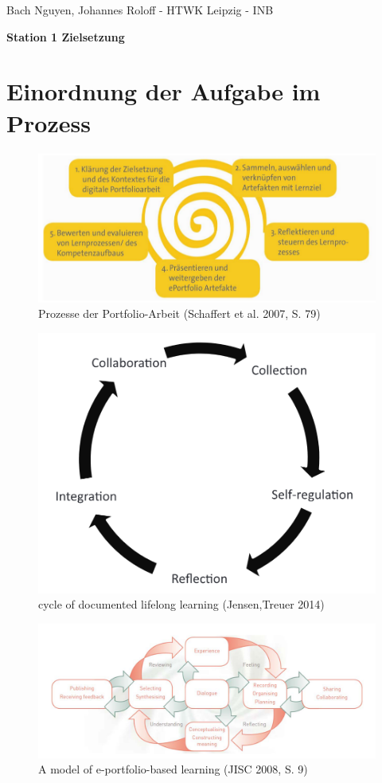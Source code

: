 \documentclass[a4paper,oneside]{scrarticle}
\begin{document}
	\begin{flushleft}
		Bach Nguyen, Johannes Roloff - HTWK Leipzig - INB
	\end{flushleft}

	\begin{center}
		\begin{LARGE}
			\textbf{Station 1 Zielsetzung}
		\end{LARGE}
	\end{center}
	\section*{Einordnung der Aufgabe im Prozess}
	\begin{figure} [h]
		\centering
		\includegraphics[width=0.7\linewidth]{e-portfolio-prozesse-schaffert}
		\caption{Prozesse der Portfolio-Arbeit (Schaffert et al. 2007, S. 79)}
		\label{fig:e-portfolio-prozesse-schaffert}
	\end{figure}
	\begin{figure}[h]
		\centering
		\includegraphics[width=0.5\linewidth]{cycle-of-documented-lifelong-learning-Jensen}
		\caption{cycle of documented lifelong learning (Jensen,Treuer 2014)}
		\label{fig:cycle-of-documented-lifelong-learning-jensen}
	\end{figure}
	\begin{figure}[h]
		\centering
		\includegraphics[width=0.8\linewidth]{model-of-e-portfolio-based-learning}
		\caption{A model of e-portfolio-based learning (JISC 2008, S. 9)}
		\label{fig:model-of-e-portfolio-based-learning}
	\end{figure}
\end{document}
